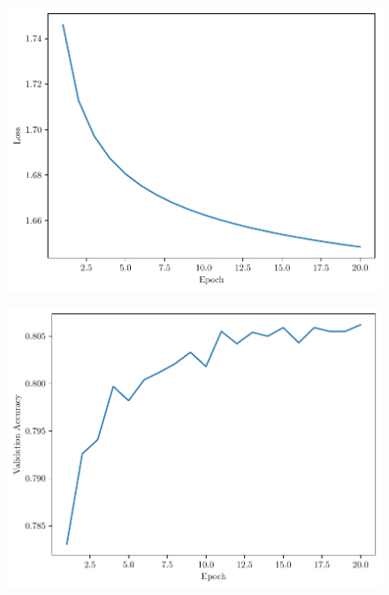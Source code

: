 \begin{questions}
        \begin{figure}[H]
            \centering
            \includegraphics[scale = 0.75]{logistic_regression-training-loss-0.01-sgd.pdf}
        \end{figure}

        \begin{figure}[H]
            \centering
            \includegraphics[scale = 0.75]{logistic_regression-validation-accuracy-0.01-sgd.pdf}
        \end{figure}


\end{questions}
